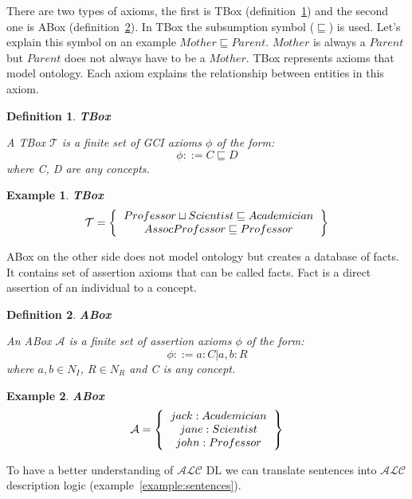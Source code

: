 \documentclass[12pt,a4paper]{article}
\newtheorem{definition}{Definition}[subsection]
\newtheorem{example}{Example}[subsection]
\begin{document}
There are two types of axioms, the first is TBox (definition~\ref{def:tbox}) and the second one is ABox (definition~\ref{def:abox}). In TBox the subsumption symbol ($\sqsubseteq$) is used. Let's explain this symbol on an example $Mother \sqsubseteq Parent$. $Mother$ is always a $Parent$ but $Parent$ does not always have to be a $Mother$. TBox represents axioms that model ontology. Each axiom explains the relationship between entities in this axiom.

\begin{definition}{\textbf{TBox}}
	\label{def:tbox}
	
	A TBox $\mathcal{T}$ is a finite set of GCI axioms $\phi$ of the form:
	\[ \phi ::= C \sqsubseteq D \]	
	where C, D are any concepts.
\end{definition}

\begin{example}{\textbf{TBox}}
	\[ 
	\mathcal{T} = \left\{
	\begin{tabular}{c c}
	$Professor \sqcup Scientist \sqsubseteq Academician$ \\
	$AssocProfessor \sqsubseteq Professor$ \\
	\end{tabular}
	\right \}
	\]
\end{example}

ABox on the other side does not model ontology but creates a database of facts. It contains set of assertion axioms that can be called facts. Fact is a direct assertion of an individual to a concept.

\newpage
\begin{definition}{\textbf{ABox}}
	\label{def:abox}
	
    An ABox $\mathcal{A}$ is a finite set of assertion axioms $\phi$ of the form:
	\[ \phi ::= a:C | a,b:R \]
	where $a,b \in N_{I}$, $R \in N_{R}$ and C is any concept.
\end{definition}

\begin{example}{\textbf{ABox}}
	\[ 
	\mathcal{A} = \left\{
	\begin{tabular}{c c}
	$jack : Academician$ \\
	$jane : Scientist$ \\
	$john : Professor$ \\
	\end{tabular}
	\right \}
	\]
\end{example}

To have a better understanding of $\mathcal{ALC}$ DL we can translate sentences into $\mathcal{ALC}$ description logic (example~\ref{example:sentences}).
\end{document}
